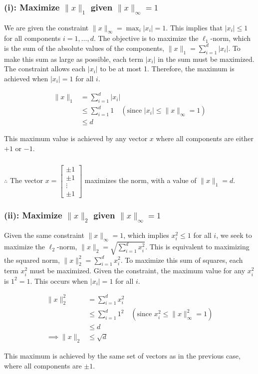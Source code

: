 \documentclass{article}
\begin{document}
\subsubsection*{(i): Maximize $\|x\|_1$ given $\|x\|_{\infty}=1$}
\parbox{\textwidth}{
We are given the constraint $\|x\|_{\infty} = \max_{i} |x_i| = 1$. This implies that $|x_i| \le 1$ for all components $i=1, \dots, d$. The objective is to maximize the $\ell_1$-norm, which is the sum of the absolute values of the components, $\|x\|_1 = \sum_{i=1}^d |x_i|$. To make this sum as large as possible, each term $|x_i|$ in the sum must be maximized. The constraint allows each $|x_i|$ to be at most 1. Therefore, the maximum is achieved when $|x_i|=1$ for all $i$.
}
\begin{align*}
    \|x\|_1 &= \sum_{i=1}^d |x_i| \\
    &\le \sum_{i=1}^d 1 \quad (\text{since } |x_i| \le \|x\|_{\infty} = 1) \\
    &\le d
\end{align*}
\parbox{\textwidth}{
This maximum value is achieved by any vector $x$ where all components are either $+1$ or $-1$.
}
\subsubsection*{\normalfont}{$\therefore$ The vector $x = \begin{bmatrix} \pm 1 \\ \pm 1 \\ \vdots \\ \pm 1 \end{bmatrix}$ maximizes the norm, with a value of $\|x\|_1 = d$.}

\subsubsection*{(ii): Maximize $\|x\|_2$ given $\|x\|_{\infty}=1$}
\parbox{\textwidth}{
Given the same constraint $\|x\|_{\infty} = 1$, which implies $x_i^2 \le 1$ for all $i$, we seek to maximize the $\ell_2$-norm, $\|x\|_2 = \sqrt{\sum_{i=1}^d x_i^2}$. This is equivalent to maximizing the squared norm, $\|x\|_2^2 = \sum_{i=1}^d x_i^2$. To maximize this sum of squares, each term $x_i^2$ must be maximized. Given the constraint, the maximum value for any $x_i^2$ is $1^2=1$. This occurs when $|x_i|=1$ for all $i$.
}
\begin{align*}
    \|x\|_2^2 &= \sum_{i=1}^d x_i^2 \\
    &\le \sum_{i=1}^d 1^2 \quad (\text{since } x_i^2 \le \|x\|_{\infty}^2 = 1) \\
    &\le d \\
    \implies \|x\|_2 &\le \sqrt{d}
\end{align*}
\parbox{\textwidth}{
This maximum is achieved by the same set of vectors as in the previous case, where all components are $\pm 1$.
}
\end{document}
